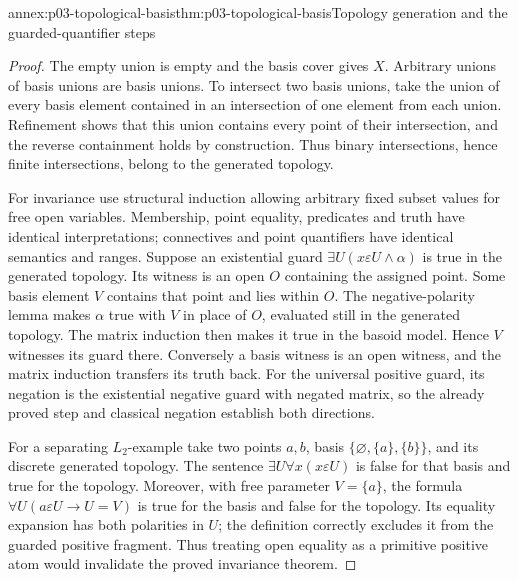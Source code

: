 \begin{annexitem}{annex:p03-topological-basis}{thm:p03-topological-basis}{Topology generation and the guarded-quantifier steps}
\begin{proof}
The empty union is empty and the basis cover gives \(X\).
Arbitrary unions of basis unions are basis unions. To intersect two basis
unions, take the union of every basis element contained in an intersection
of one element from each union. Refinement shows that this union contains
every point of their intersection, and the reverse containment holds by
construction. Thus binary intersections, hence finite intersections,
belong to the generated topology.

For invariance use structural induction allowing arbitrary fixed subset
values for free open variables. Membership, point equality, predicates and
truth have identical interpretations; connectives and point quantifiers
have identical semantics and ranges. Suppose an existential guard
\(\exists U(x\varepsilon U\land\alpha)\) is true in the generated
topology. Its witness is an open \(O\) containing the assigned point.
Some basis element \(V\) contains that point and lies within \(O\).
The negative-polarity lemma makes \(\alpha\) true with \(V\) in place
of \(O\), evaluated still in the generated topology. The matrix induction
then makes it true in the basoid model. Hence \(V\) witnesses its guard
there. Conversely a basis witness is an open witness, and the matrix
induction transfers its truth back. For the universal positive guard,
its negation is the existential negative guard with negated matrix, so the
already proved step and classical negation establish both directions.

For a separating \(L_2\)-example take two points \(a,b\), basis
\(\{\varnothing,\{a\},\{b\}\}\), and its discrete generated topology.
The sentence \(\exists U\forall x(x\varepsilon U)\) is false for
that basis and true for the topology. Moreover, with free parameter
\(V=\{a\}\), the formula \(\forall U(a\varepsilon U\to U=V)\)
is true for the basis and false for the topology. Its equality expansion
has both polarities in \(U\); the definition correctly excludes it from
the guarded positive fragment. Thus treating open equality as a primitive
positive atom would invalidate the proved invariance theorem.
\end{proof}
\end{annexitem}

